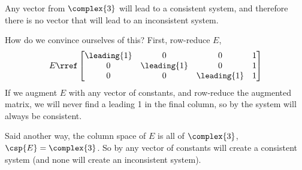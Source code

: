 Any vector from $\complex{3}$ will lead to a consistent system, and therefore there is no vector that will lead to an inconsistent system.\par
%
How do we convince ourselves of this?  First, row-reduce $E$,
%
\begin{equation*}
E\rref
\begin{bmatrix}
\leading{1} & 0 & 0 & 1\\
0 & \leading{1} & 0 & 1\\
0 & 0 & \leading{1} & 1
\end{bmatrix}
\end{equation*}
%
If we augment $E$ with any vector of constants, and row-reduce the augmented matrix, we will never find a leading 1 in the final column, so by  the system will always be consistent.\par
%
Said another way, the column space of $E$ is all of $\complex{3}$, $\csp{E}=\complex{3}$.  So by  any vector of constants will create a consistent system (and none will create an inconsistent system).